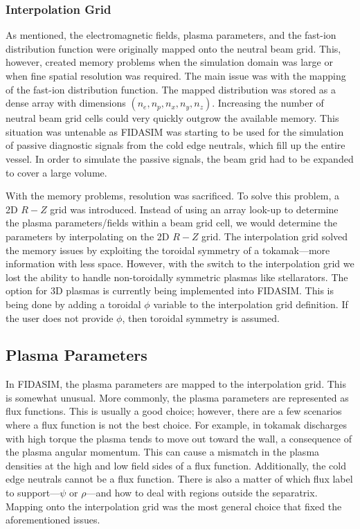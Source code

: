 \subsubsection{Interpolation Grid}
As mentioned, the electromagnetic fields, plasma parameters, and the fast-ion distribution function were originally mapped onto the neutral beam grid. This, however, created memory problems when the simulation domain was large or when fine spatial resolution was required. The main issue was with the mapping of the fast-ion distribution function. The mapped distribution was stored as a dense array with dimensions $(n_e,n_p,n_x,n_y,n_z)$. Increasing the number of neutral beam grid cells could very quickly outgrow the available memory. This situation was untenable as FIDASIM was starting to be used for the simulation of passive diagnostic signals from the cold edge neutrals, which fill up the entire vessel. In order to simulate the passive signals, the beam grid had to be expanded to cover a large volume. 

With the memory problems, resolution was sacrificed. To solve this problem, a 2D $R-Z$ grid was introduced. Instead of using an array look-up to determine the plasma parameters/fields within a beam grid cell, we would determine the parameters by interpolating on the 2D $R-Z$ grid. The interpolation grid solved the memory issues by exploiting the toroidal symmetry of a tokamak---more information with less space. However, with the switch to the interpolation grid we lost the ability to handle non-toroidally symmetric plasmas like stellarators. The option for 3D plasmas is currently being implemented into FIDASIM. This is being done by adding a toroidal $\phi$ variable to the interpolation grid definition. If the user does not provide $\phi$, then toroidal symmetry is assumed.

\subsection{Plasma Parameters}
In FIDASIM, the plasma parameters are mapped to the interpolation grid. This is somewhat unusual. More commonly, the plasma parameters are represented as flux functions. This is usually a good choice; however, there are a few scenarios where a flux function is not the best choice. For example, in tokamak discharges with high torque the plasma tends to move out toward the wall, a consequence of the plasma angular momentum. This can cause a mismatch in the plasma densities at the high and low field sides of a flux function. Additionally, the cold edge neutrals cannot be a flux function. There is also a matter of which flux label to support---$\psi$ or $\rho$---and how to deal with regions outside the separatrix. Mapping onto the interpolation grid was the most general choice that fixed the aforementioned issues.

